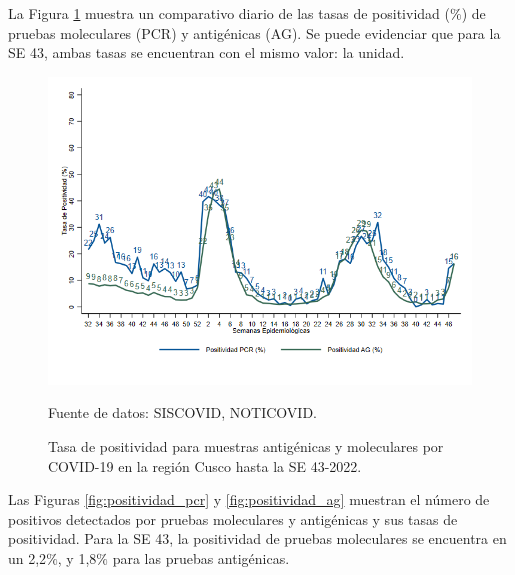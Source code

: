 \documentclass[12pt,a4paper,openany]{book}
\begin{document}
	\pagebreak
	
	
	La Figura \ref{fig:total_muestras_procesada} muestra un comparativo diario de las tasas de positividad ($\%$) de pruebas moleculares (PCR) y antigénicas (AG). Se puede evidenciar que para la SE 43, ambas tasas se encuentran con el mismo valor: la unidad.
	
	\begin{figure}[h]
		\caption{Tasa de positividad para muestras antigénicas y moleculares por COVID-19 en la región Cusco hasta la SE 43-2022. }\label{fig:total_muestras_procesada}
		\begin{center}
			\includegraphics[width=0.80\linewidth]{../figuras/positividad_diaria_2021_2022.png}
		\end{center}
		{\footnotesize {Fuente de datos: SISCOVID, NOTICOVID.}}
	\end{figure}
	
	
	
	Las Figuras \ref{fig:positividad_pcr} y \ref{fig:positividad_ag} muestran el número de positivos detectados por pruebas moleculares y antigénicas y sus tasas de positividad. Para la SE 43, la positividad de pruebas moleculares se encuentra en un 2,2$\%$, y 1,8$\%$ para las pruebas antigénicas.
	
\end{document}
